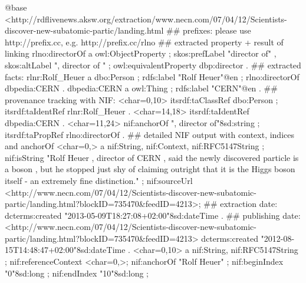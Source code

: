 @base <http://rdflivenews.aksw.org/extraction/www.necn.com/07/04/12/Scientists-discover-new-subatomic-partic/landing.html%
## prefixes: please use http://prefix.cc, e.g. http://prefix.cc/rlno
## extracted property + result of linking
rlno:directorOf a owl:ObjectProperty ; 
  skos:prefLabel "director of" , skos:altLabel ", director of " ;  
  owl:equivalentProperty dbp:director .
## extracted facts:
rlnr:Rolf_Heuer a dbo:Person ; 
  rdfs:label "Rolf Heuer"@en ;
  rlno:directorOf dbpedia:CERN .
dbpedia:CERN a owl:Thing ; 
  rdfs:label "CERN"@en .
## provenance tracking with NIF:
<char=0,10>   itsrdf:taClassRef dbo:Person ; 
  itsrdf:taIdentRef rlnr:Rolf_Heuer .
<char=14,18>  itsrdf:taIdentRef dbpedia:CERN .
<char=11,24>  nif:anchorOf      ", director of"^^xsd:string ;
  itsrdf:taPropRef rlno:directorOf .
## detailed NIF output with context, indices and anchorOf
<char=0,> a nif:String, nif:Context, nif:RFC5147String ;
  nif:isString "Rolf Heuer , director of CERN , said the newly discovered particle is a boson , but he stopped just shy of claiming outright that it is the Higgs boson itself - an extremely fine distinction." ;
  nif:sourceUrl <http://www.necn.com/07/04/12/Scientists-discover-new-subatomic-partic/landing.html?blockID=735470&feedID=4213>;
## extraction date:  
  dcterms:created "2013-05-09T18:27:08+02:00"^^xsd:dateTime .
## publishing date:
<http://www.necn.com/07/04/12/Scientists-discover-new-subatomic-partic/landing.html?blockID=735470&feedID=4213>
  dcterms:created "2012-08-15T14:48:47+02:00"^^xsd:dateTime .
<char=0,10> a nif:String, nif:RFC5147String ;
  nif:referenceContext <char=0,>; nif:anchorOf "Rolf Heuer" ;
  nif:beginIndex "0"^^xsd:long ; nif:endIndex "10"^^xsd:long ;
